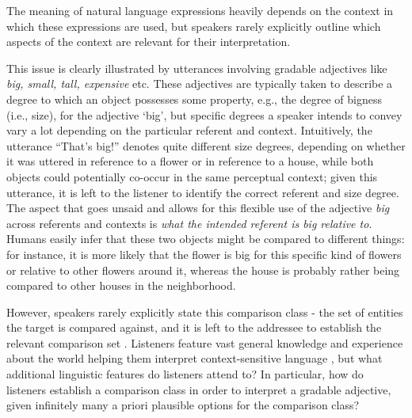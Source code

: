 The meaning of natural language expressions heavily depends on the context in which these expressions are used, but speakers rarely explicitly outline which aspects of the context are relevant for their interpretation. 

This issue is clearly illustrated by utterances involving gradable adjectives like \textit{big, small, tall, expensive} etc. These adjectives are typically taken to describe a degree to which an object possesses some property, e.g., the degree of bigness (i.e., size), for the adjective ‘big’, but specific degrees a speaker intends to convey vary a lot depending on the particular referent and context. Intuitively, the utterance “That’s big!” denotes quite different size degrees, depending on whether it was uttered in reference to a flower or in reference to a house, while both objects could potentially co-occur in the same perceptual context; given this utterance, it is left to the listener to identify the correct referent and size degree. The aspect that goes unsaid and allows for this flexible use of the adjective \textit{big} across referents and contexts is \textit{what the intended referent is big relative to}. Humans easily infer that these two objects might be compared to different things: for instance, it is more likely that the flower is big for this specific kind of flowers or relative to other flowers around it, whereas the house is probably rather being compared to other houses in the neighborhood. 

However, speakers rarely explicitly state this comparison class - the set of entities the target is compared against, and it is left to the addressee to establish the relevant comparison set \parencite{Solt2009}. Listeners feature vast general knowledge and experience about the world helping them interpret context-sensitive language \parencite{tessler2017warm}, but what additional linguistic features do listeners attend to? In particular, how do listeners establish a comparison class in order to interpret a gradable adjective, given infinitely many a priori plausible options for the comparison class? 

